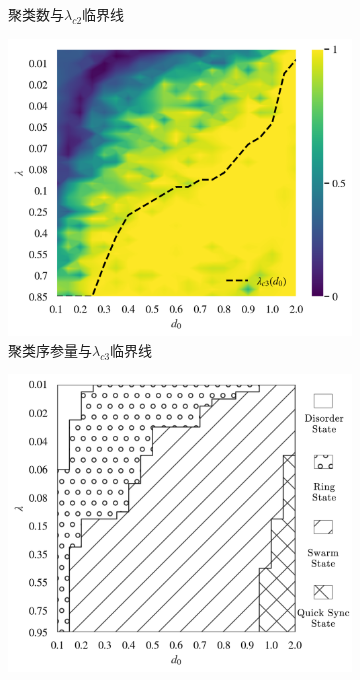 \documentclass{article}
\begin{document}
\begin{figure}[H]
\begin{subfigure}[b]{0.49\textwidth}
		\vspace{-1cm}
		\caption{聚类数与$\lambda_{c2}$临界线}
	\end{subfigure}
	\begin{subfigure}[b]{0.49\textwidth}
		\includegraphics[width=\textwidth]{./figs/circleSwarmEdgesTotalSync.png}
		\vspace{-1cm}
		\caption{聚类序参量与$\lambda_{c3}$临界线}
	\end{subfigure}
	\begin{subfigure}[b]{0.49\textwidth}
		\includegraphics[width=\textwidth]{./figs/subjectiveOp3.png}

\end{subfigure}
\end{figure}
\end{document}
